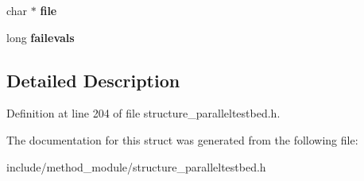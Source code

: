 \begin{DoxyCompactItemize}
\item 
\hypertarget{structexecution__vars_a5f93f53a90673d8b25e1dde6f4a3e536}{char $\ast$ {\bfseries file}}\label{structexecution__vars_a5f93f53a90673d8b25e1dde6f4a3e536}

\item 
\hypertarget{structexecution__vars_a16c66b1430d3379ee272d7779d34eaf4}{long {\bfseries failevals}}\label{structexecution__vars_a16c66b1430d3379ee272d7779d34eaf4}

\end{DoxyCompactItemize}


\subsection{Detailed Description}


Definition at line 204 of file structure\-\_\-paralleltestbed.\-h.



The documentation for this struct was generated from the following file\-:\begin{DoxyCompactItemize}
\item 
include/method\-\_\-module/structure\-\_\-paralleltestbed.\-h\end{DoxyCompactItemize}
